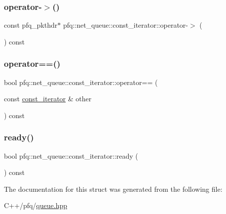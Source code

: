 \subsubsection{\texorpdfstring{operator-\/$>$()}{operator->()}}
{\footnotesize\ttfamily const pfq\+\_\+pkthdr$\ast$ pfq\+::net\+\_\+queue\+::const\+\_\+iterator\+::operator-\/$>$ (\begin{DoxyParamCaption}{ }\end{DoxyParamCaption}) const\hspace{0.3cm}{\ttfamily [inline]}}

\mbox{\label{structpfq_1_1net__queue_1_1const__iterator_a4b38c35b765584ef7235abf6ff09398c}} 
\subsubsection{\texorpdfstring{operator==()}{operator==()}}
{\footnotesize\ttfamily bool pfq\+::net\+\_\+queue\+::const\+\_\+iterator\+::operator== (\begin{DoxyParamCaption}\item[{const \hyperlink{structpfq_1_1net__queue_1_1const__iterator}{const\+\_\+iterator} \&}]{other }\end{DoxyParamCaption}) const\hspace{0.3cm}{\ttfamily [inline]}}

\mbox{\label{structpfq_1_1net__queue_1_1const__iterator_aa086fec495f365981c86348de5750f7b}} 
\subsubsection{\texorpdfstring{ready()}{ready()}}
{\footnotesize\ttfamily bool pfq\+::net\+\_\+queue\+::const\+\_\+iterator\+::ready (\begin{DoxyParamCaption}{ }\end{DoxyParamCaption}) const\hspace{0.3cm}{\ttfamily [inline]}}



The documentation for this struct was generated from the following file\+:\begin{DoxyCompactItemize}
\item 
C++/pfq/\hyperlink{queue_8hpp}{queue.\+hpp}\end{DoxyCompactItemize}
